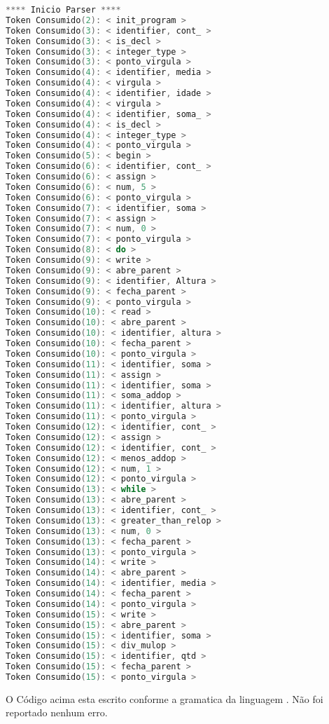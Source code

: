 \begin{lstlisting}[caption={Saida para o Codigo de teste  : Teste.txt},label={Entrada 1},language=C]
**** Inicio Parser ****
Token Consumido(2): < init_program >
Token Consumido(3): < identifier, cont_ >
Token Consumido(3): < is_decl >
Token Consumido(3): < integer_type >
Token Consumido(3): < ponto_virgula >
Token Consumido(4): < identifier, media >
Token Consumido(4): < virgula >
Token Consumido(4): < identifier, idade >
Token Consumido(4): < virgula >
Token Consumido(4): < identifier, soma_ >
Token Consumido(4): < is_decl >
Token Consumido(4): < integer_type >
Token Consumido(4): < ponto_virgula >
Token Consumido(5): < begin >
Token Consumido(6): < identifier, cont_ >
Token Consumido(6): < assign >
Token Consumido(6): < num, 5 >
Token Consumido(6): < ponto_virgula >
Token Consumido(7): < identifier, soma >
Token Consumido(7): < assign >
Token Consumido(7): < num, 0 >
Token Consumido(7): < ponto_virgula >
Token Consumido(8): < do >
Token Consumido(9): < write >
Token Consumido(9): < abre_parent >
Token Consumido(9): < identifier, Altura >
Token Consumido(9): < fecha_parent >
Token Consumido(9): < ponto_virgula >
Token Consumido(10): < read >
Token Consumido(10): < abre_parent >
Token Consumido(10): < identifier, altura >
Token Consumido(10): < fecha_parent >
Token Consumido(10): < ponto_virgula >
Token Consumido(11): < identifier, soma >
Token Consumido(11): < assign >
Token Consumido(11): < identifier, soma >
Token Consumido(11): < soma_addop >
Token Consumido(11): < identifier, altura >
Token Consumido(11): < ponto_virgula >
Token Consumido(12): < identifier, cont_ >
Token Consumido(12): < assign >
Token Consumido(12): < identifier, cont_ >
Token Consumido(12): < menos_addop >
Token Consumido(12): < num, 1 >
Token Consumido(12): < ponto_virgula >
Token Consumido(13): < while >
Token Consumido(13): < abre_parent >
Token Consumido(13): < identifier, cont_ >
Token Consumido(13): < greater_than_relop >
Token Consumido(13): < num, 0 >
Token Consumido(13): < fecha_parent >
Token Consumido(13): < ponto_virgula >
Token Consumido(14): < write >
Token Consumido(14): < abre_parent >
Token Consumido(14): < identifier, media >
Token Consumido(14): < fecha_parent >
Token Consumido(14): < ponto_virgula >
Token Consumido(15): < write >
Token Consumido(15): < abre_parent >
Token Consumido(15): < identifier, soma >
Token Consumido(15): < div_mulop >
Token Consumido(15): < identifier, qtd >
Token Consumido(15): < fecha_parent >
Token Consumido(15): < ponto_virgula >
\end{lstlisting}
O Código acima esta escrito conforme a gramatica da linguagem . Não foi reportado nenhum erro.


\newline


